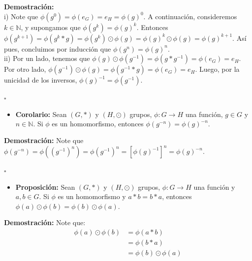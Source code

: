\documentclass[10 pt]{article}
\begin{document}
\Large{\textbf{Demostración:} \\

i) Note que $\phi(g^0)=\phi(e_G)=e_H=\phi(g)^0$. A continuación, consideremos $k \in \mathbb N$, y supongamos que $\phi(g^k)=\phi(g)^k$. Entonces $\phi(g^{k+1})=\phi(g^{k}*g)=\phi(g^k)\odot \phi(g)=\phi(g)^k \odot \phi(g)=\phi(g)^{k+1}$. Así pues, concluimos por inducción que $\phi(g^n)=\phi(g)^n$. \\

ii) Por un lado, tenemos que $\phi(g)\odot\phi(g^{-1})=\phi(g*g^{-1})=\phi(e_G)=e_H$. Por otro lado, $\phi(g^{-1}) \odot \phi(g)=\phi(g^{-1}*g)=\phi(e_G)=e_H$. Luego, por la unicidad de los inversos, $\phi(g)^{-1}=\phi(g^{-1})$.} \\

\begin{flushright}
    $\square$
\end{flushright}

\begin{itemize}
    \item \Large{\textbf{Corolario:} Sean $(G,*)$ y $(H,\odot)$ grupos, $\phi:G \rightarrow H$ una función, $g \in G$ y $n \in \mathbb N$. Si $\phi$ es un homomorfismo, entonces $\phi(g^{-n})=\phi(g)^{-n}$.} \\
\end{itemize}

\Large{\textbf{Demostración:} Note que $\phi(g^{-n})=\phi((g^{-1})^n)=\phi(g^{-1})^n=[\phi(g)^{-1}]^n=\phi(g)^{-n}$.} \\

\begin{flushright}
    $\square$ 
\end{flushright}

\begin{itemize}
    \item \Large{\textbf{Proposición:} Sean $(G,*)$ y $(H,\odot)$ grupos, $\phi:G \rightarrow H$ una función y $a,b \in G$. Si $\phi$ es un homomorfismo y $a*b=b*a$, entonces $\phi(a)\odot\phi(b)=\phi(b) \odot \phi(a)$.} \\
\end{itemize}

\Large{\textbf{Demostración:} Note que:}
\begin{align*}
    \phi(a)\odot \phi(b)&=\phi(a*b) \\
    &=\phi(b*a) \\
    &=\phi(b) \odot \phi(a)
\end{align*}
\end{document}
